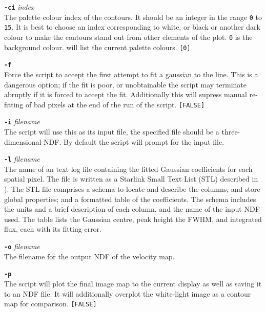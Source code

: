 \documentclass[twoside,11pt,nolof]{starlink}
\begin{document}
{{{         \sstitem
         {\bf{\tt{-ci}}} \emph{index}\\
           The palette colour index of the contours.  It should be an
           integer in the range \texttt{0} to \texttt{15}.  It is best to choose
           an index corresponding to white, or black or another dark colour
           to make the contours stand out from other elements of the plot.
           \texttt{0} is the background colour. 
           will list the current palette colours.  \texttt{[0]}

         \sstitem
         {\bf{\tt{-f}}}\\
           Force the script to accept the first attempt to fit a gaussian to
           the line.  This is a dangerous option; if the fit is poor, or
           unobtainable the script may terminate abruptly if it is forced to
           accept the fit.  Additionally this will supress manual re-fitting
           of bad pixels at the end of the run of the script.  \texttt{[FALSE]}

         \sstitem
         {\bf{\tt{-i}}} \emph{filename}\\
           The script will use this as its input file, the specified file should
           be a three-dimensional NDF.  By default the script will prompt for the
           input file.

         \sstitem
         {\bf{\tt{-l}}} \emph{filename}\\
           The name of an text log file containing the fitted Gaussian
           coefficients for each spatial pixel.  The file is written as a
           Starlink Small Text List (STL) described in
           ).  The STL file comprises a schema to
           locate and describe the columns, and store global properties; and a
           formatted table of the coefficients.  The schema includes the units
           and a brief description of each column, and the name of the input
           NDF used.  The table lists the Gaussian centre, peak height the FWHM,
           and integrated flux, each with its fitting error.

         \sstitem
         {\bf{\tt{-o}}} \emph{filename}\\
           The filename for the output NDF of the velocity map.

         \sstitem
         {\bf{\tt{-p}}}\\
           The script will plot the final image map to the current display
           as well as saving it to an NDF file.  It will additionally overplot
           the white-light image as a contour map for comparison.
           \texttt{[FALSE]}

}}}
\end{document}
